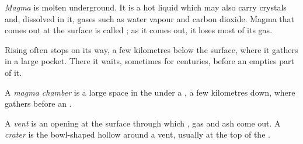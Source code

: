 \begin{definition}[Magma]\label{def:g7:volcanoes:magma}
\emph{Magma} is molten  underground. It is a hot liquid
which may also carry crystals and, dissolved in it, gases such as water
vapour and carbon dioxide. Magma that comes out at the surface is called
; as it comes out, it loses most of its gas.
\end{definition}

Rising  often stops on its way, a few kilometres below the surface,
where it gathers in a large pocket. There it waits, sometimes for
centuries, before an  empties part of it.

\begin{definition}\label{def:g7:volcanoes:magma-chamber}
A \emph{magma chamber} is a large space in the 
under a , a few kilometres down, where  gathers before an
.
\end{definition}

\begin{definition}\label{def:g7:volcanoes:vent}
A \emph{vent} is an opening at the surface through which ,
gas and ash come out. A \emph{crater} is the bowl-shaped
hollow around a vent, usually at the top of the .
\end{definition}

